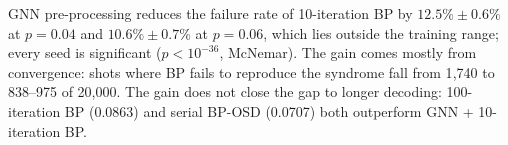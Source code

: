 GNN pre-processing reduces the failure rate of 10-iteration BP by
$12.5\%\pm0.6\%$ at $p=0.04$ and $10.6\%\pm0.7\%$ at $p=0.06$, which lies
outside the training range; every seed is significant
($p<10^{-36}$, McNemar). The gain comes mostly from convergence: shots where
BP fails to reproduce the syndrome fall from 1{,}740 to 838--975 of 20{,}000.
The gain does not close the gap to longer decoding: 100-iteration BP (0.0863)
and serial BP-OSD (0.0707) both outperform GNN + 10-iteration BP.
